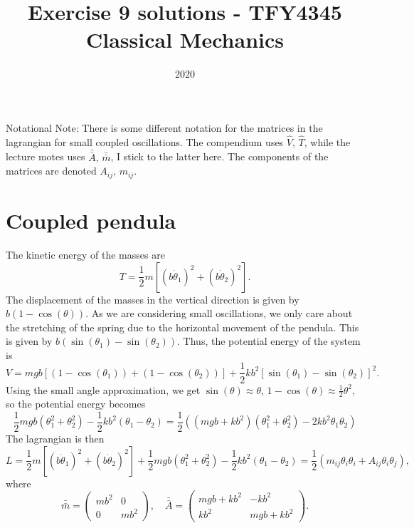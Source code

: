 \documentclass{article}
\title{Exercise 9 solutions - TFY4345 Classical Mechanics}
\date{2020}
\begin{document}
    \maketitle
    Notational Note: There is some different notation for the matrices in the lagrangian for small coupled oscillations. The compendium uses $\hat V, \, \hat T$, while the lecture motes uses $\bar {\bar A}, \, \bar {\bar m}$, I stick to the latter here. The components of the matrices are denoted $A_{ij}, \, m_{ij}$.
    \section{Coupled pendula}
    The kinetic energy of the masses are 
    \begin{equation*}
        T = \frac{1}{2}m\left[(b \dot \theta_1)^2 + (b \dot \theta_2)^2\right].
    \end{equation*}
    The displacement of the masses in the vertical direction is given by $b(1 - \cos(\theta))$. As we are considering small oscillations, we only care about the stretching of the spring due to the horizontal movement of the pendula. This is given by $b (\sin(\theta_1) - \sin(\theta_2))$. Thus, the potential energy of the system is
    \begin{equation*}
        V = mgb\left[(1 - \cos(\theta_1)) + (1 - \cos(\theta_2))\right] + \frac{1}{2}kb^2\left[\sin(\theta_1) - \sin(\theta_2)\right]^2.
    \end{equation*}
    Using the small angle approximation, we get $\sin(\theta) \approx \theta$, $1 - \cos(\theta) \approx \frac{1}{2} \theta^2$, so the potential energy becomes
    \begin{equation*}
        \frac{1}{2} mgb (\theta_1^2 + \theta_2^2) - \frac{1}{2}kb^2(\theta_1 - \theta_2) = \frac{1}{2}\left((mgb + kb^2)(\theta_1^2 + \theta_2^2) - 2kb^2 \theta_1 \theta_2\right)
    \end{equation*}
    The lagrangian is then
    \begin{equation*}
        L = \frac{1}{2}m\left[(b \dot \theta_1)^2 + (b \dot \theta_2)^2\right] + \frac{1}{2} mgb (\theta_1^2 + \theta_2^2) - \frac{1}{2}kb^2(\theta_1 - \theta_2)  = \frac{1}{2}\left(m_{ij}\theta_i \theta_i + A_{ij}\theta_i \theta_j\right),
    \end{equation*}
    where
    \begin{equation*}
        \bar {\bar m} = 
        \begin{pmatrix*}
            mb^2 & 0 \\
            0 & mb^2
        \end{pmatrix*}
        , \quad \bar {\bar A} = 
        \begin{pmatrix}
            mgb + kb^2 & -kb^2 \\
            kb^2 & mgb + kb^2
        \end{pmatrix}.
    \end{equation*}
\end{document}
